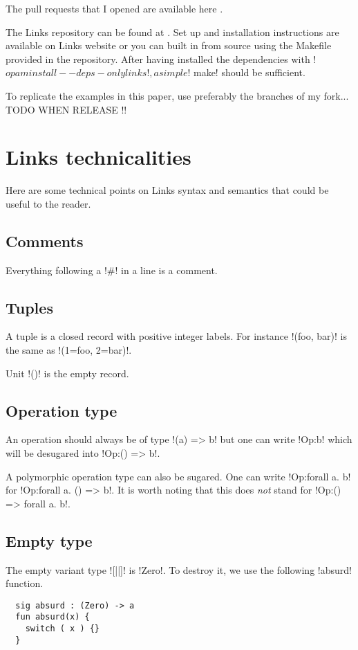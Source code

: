 \documentclass[11pt, nonacm=true, language=french, language=english]{acmart}
\begin{document}
The pull requests that I opened are available here \cite{gh:prs}.

The Links repository can be found at \cite{gh:links}. Set up and installation instructions are available on Links website \cite{links-org} or you can built in from source using the Makefile provided in the repository. After having installed the dependencies with !$ opam install --deps-only links!, a simple !$ make! should be sufficient.

To replicate the examples in this paper, use preferably the branches of my fork... TODO WHEN RELEASE !!

\section{Links technicalities}
\label{sec:tech}

Here are some technical points on Links syntax and semantics that could be useful to the reader.

\subsection{Comments}
\label{sec:comments}
Everything following a !#! in a line is a comment.

\subsection{Tuples}
\label{sec:tuples}
A tuple is a closed record with positive integer labels. For instance !(foo, bar)! is the same as !(1=foo, 2=bar)!.

Unit !()! is the empty record.


\subsection{Operation type}
\label{sec:operation-type}
An operation should always be of type !(a) => b! but one can write !Op:b! which will be desugared into !Op:() => b!.

A polymorphic operation type can also be sugared. One can write !Op:forall a. b! for !Op:forall a. () => b!. It is worth noting that this does \emph{not} stand for !Op:() => forall a. b!.

\subsection{Empty type}
\label{sec:tech:zero}
The empty variant type ![||]! is !Zero!. To destroy it, we use the following !absurd! function.
\begin{lstlisting}
  sig absurd : (Zero) -> a
  fun absurd(x) {
    switch ( x ) {}
  }
\end{lstlisting}
\end{document}

